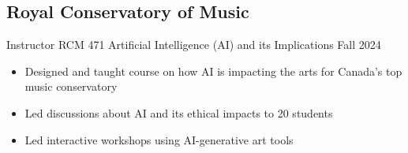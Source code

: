 \subsection{Royal Conservatory of Music}

Instructor RCM 471 Artificial Intelligence (AI) and its Implications \hfill Fall 2024\\
\begin{itemize} 
\item Designed and taught course on how AI is impacting the arts for Canada's top music conservatory
\item Led discussions about AI and its ethical impacts to 20 students
\item Led interactive workshops using AI-generative art tools
\end{itemize} 
